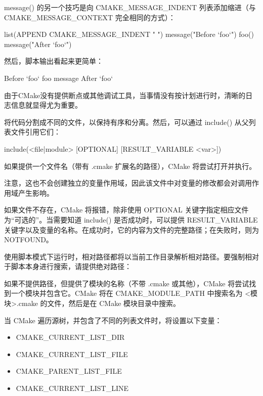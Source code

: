 message() 的另一个技巧是向 CMAKE\_MESSAGE\_INDENT 列表添加缩进（与 CMAKE\_MESSAGE\_CONTEXT 完全相同的方式）：

\begin{cmake}
list(APPEND CMAKE_MESSAGE_INDENT " ")
message("Before `foo`")
foo()
message("After `foo`")
\end{cmake}

然后，脚本输出看起来更简单：

\begin{shell}
Before `foo`
    foo message
After `foo`
\end{shell}

由于CMake没有提供断点或其他调试工具，当事情没有按计划进行时，清晰的日志信息就显得尤为重要。


将代码分割成不同的文件，以保持有序和分离。然后，可以通过 include() 从父列表文件引用它们：

\begin{shell}
include(<file|module> [OPTIONAL] [RESULT_VARIABLE <var>])
\end{shell}

如果提供一个文件名（带有 .cmake 扩展名的路径），CMake 将尝试打开并执行。

注意，这也不会创建独立的变量作用域，因此该文件中对变量的修改都会对调用作用域产生影响。

如果文件不存在，CMake 将报错，除非使用 OPTIONAL 关键字指定相应文件为“可选的”。当需要知道 include() 是否成功时，可以提供 RESULT\_VARIABLE 关键字以及变量的名称。在成功时，它的内容为文件的完整路径；在失败时，则为 NOTFOUND。

使用脚本模式下运行时，相对路径都将以当前工作目录解析相对路径。要强制相对于脚本本身进行搜索，请提供绝对路径：


如果不提供路径，但提供了模块的名称（不带 .cmake 或其他），CMake 将尝试找到一个模块并包含它。CMake 将在 CMAKE\_MODULE\_PATH 中搜索名为 <模块>.cmake 的文件，然后是在 CMake 模块目录中搜索。

当 CMake 遍历源树，并包含了不同的列表文件时，将设置以下变量：

\begin{itemize}
\item
CMAKE\_CURRENT\_LIST\_DIR

\item
CMAKE\_CURRENT\_LIST\_FILE

\item
CMAKE\_PARENT\_LIST\_FILE

\item
CMAKE\_CURRENT\_LIST\_LINE
\end{itemize}

